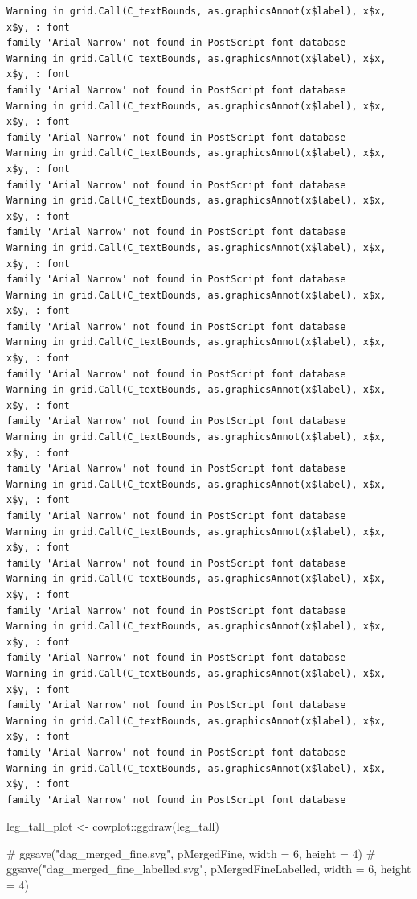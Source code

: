 \documentclass[
  letterpaper,
  DIV=11,
  numbers=noendperiod]{scrartcl}
\newenvironment{Shaded}{\begin{snugshade}}{\end{snugshade}}
\newcommand{\CommentTok}[1]{\textcolor[rgb]{0.37,0.37,0.37}{#1}}
\newcommand{\FunctionTok}[1]{\textcolor[rgb]{0.28,0.35,0.67}{#1}}
\newcommand{\NormalTok}[1]{\textcolor[rgb]{0.00,0.23,0.31}{#1}}
\newcommand{\OtherTok}[1]{\textcolor[rgb]{0.00,0.23,0.31}{#1}}
\newcommand{\SpecialCharTok}[1]{\textcolor[rgb]{0.37,0.37,0.37}{#1}}
\begin{document}
\begin{verbatim}
Warning in grid.Call(C_textBounds, as.graphicsAnnot(x$label), x$x, x$y, : font
family 'Arial Narrow' not found in PostScript font database
Warning in grid.Call(C_textBounds, as.graphicsAnnot(x$label), x$x, x$y, : font
family 'Arial Narrow' not found in PostScript font database
Warning in grid.Call(C_textBounds, as.graphicsAnnot(x$label), x$x, x$y, : font
family 'Arial Narrow' not found in PostScript font database
Warning in grid.Call(C_textBounds, as.graphicsAnnot(x$label), x$x, x$y, : font
family 'Arial Narrow' not found in PostScript font database
Warning in grid.Call(C_textBounds, as.graphicsAnnot(x$label), x$x, x$y, : font
family 'Arial Narrow' not found in PostScript font database
Warning in grid.Call(C_textBounds, as.graphicsAnnot(x$label), x$x, x$y, : font
family 'Arial Narrow' not found in PostScript font database
Warning in grid.Call(C_textBounds, as.graphicsAnnot(x$label), x$x, x$y, : font
family 'Arial Narrow' not found in PostScript font database
Warning in grid.Call(C_textBounds, as.graphicsAnnot(x$label), x$x, x$y, : font
family 'Arial Narrow' not found in PostScript font database
Warning in grid.Call(C_textBounds, as.graphicsAnnot(x$label), x$x, x$y, : font
family 'Arial Narrow' not found in PostScript font database
Warning in grid.Call(C_textBounds, as.graphicsAnnot(x$label), x$x, x$y, : font
family 'Arial Narrow' not found in PostScript font database
Warning in grid.Call(C_textBounds, as.graphicsAnnot(x$label), x$x, x$y, : font
family 'Arial Narrow' not found in PostScript font database
Warning in grid.Call(C_textBounds, as.graphicsAnnot(x$label), x$x, x$y, : font
family 'Arial Narrow' not found in PostScript font database
Warning in grid.Call(C_textBounds, as.graphicsAnnot(x$label), x$x, x$y, : font
family 'Arial Narrow' not found in PostScript font database
Warning in grid.Call(C_textBounds, as.graphicsAnnot(x$label), x$x, x$y, : font
family 'Arial Narrow' not found in PostScript font database
Warning in grid.Call(C_textBounds, as.graphicsAnnot(x$label), x$x, x$y, : font
family 'Arial Narrow' not found in PostScript font database
Warning in grid.Call(C_textBounds, as.graphicsAnnot(x$label), x$x, x$y, : font
family 'Arial Narrow' not found in PostScript font database
Warning in grid.Call(C_textBounds, as.graphicsAnnot(x$label), x$x, x$y, : font
family 'Arial Narrow' not found in PostScript font database
\end{verbatim}

\begin{Shaded}
\begin{Highlighting}[]
\NormalTok{leg\_tall\_plot }\OtherTok{\textless{}{-}}\NormalTok{ cowplot}\SpecialCharTok{::}\FunctionTok{ggdraw}\NormalTok{(leg\_tall)}


\CommentTok{\# ggsave("dag\_merged\_fine.svg", pMergedFine, width = 6, height = 4)}
\CommentTok{\# ggsave("dag\_merged\_fine\_labelled.svg", pMergedFineLabelled, width = 6, height = 4)}
\end{Highlighting}
\end{Shaded}
\end{document}
